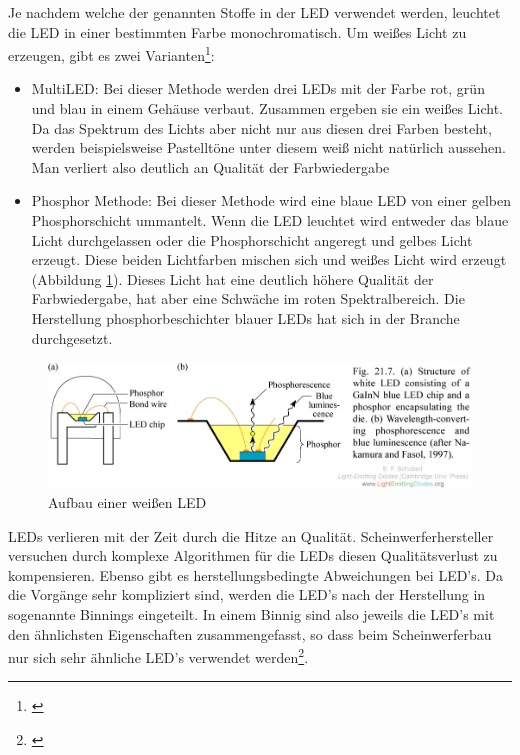 \noindent Je nachdem welche der genannten Stoffe in der LED verwendet werden, leuchtet die LED in einer bestimmten Farbe monochromatisch. Um weißes Licht zu erzeugen, gibt es zwei Varianten\footnote{\cite[151-152]{mueller}}:

\begin{itemize}
\item MultiLED: Bei dieser Methode werden drei LEDs mit der Farbe rot, grün und blau in einem Gehäuse verbaut. Zusammen ergeben sie ein weißes Licht. Da das Spektrum des Lichts aber nicht nur aus diesen drei Farben besteht, werden beispielsweise Pastelltöne unter diesem weiß nicht natürlich aussehen. Man verliert also deutlich an Qualität der Farbwiedergabe

\item Phosphor Methode: Bei dieser Methode wird eine blaue LED von einer gelben Phosphorschicht ummantelt. Wenn die LED leuchtet wird entweder das blaue Licht durchgelassen oder die Phosphorschicht angeregt und gelbes Licht erzeugt. Diese beiden Lichtfarben mischen sich und weißes Licht wird erzeugt (Abbildung \ref{b_ledw}). Dieses Licht hat eine deutlich höhere Qualität der Farbwiedergabe, hat aber eine Schwäche im roten Spektralbereich. Die Herstellung phosphorbeschichter blauer LEDs hat sich in der Branche durchgesetzt.
\end{itemize}

\begin{figure}[htp]     %
\centering
\includegraphics[width=1.0\textwidth]{bilder/ledw} 
\caption {Aufbau einer weißen LED\protect\footnotemark}\label{b_ledw}
\end{figure}

\noindent LEDs verlieren mit der Zeit durch die Hitze an Qualität. Scheinwerferhersteller versuchen durch komplexe Algorithmen für die LEDs diesen Qualitätsverlust zu kompensieren. Ebenso gibt es herstellungsbedingte Abweichungen bei LED's. Da die Vorgänge sehr kompliziert sind, werden die LED's nach der Herstellung in sogenannte Binnings eingeteilt. In einem Binnig sind also jeweils die LED's mit den ähnlichsten Eigenschaften zusammengefasst, so dass beim Scheinwerferbau nur sich sehr ähnliche LED's verwendet werden\footnote{\cite[153]{mueller}}.

